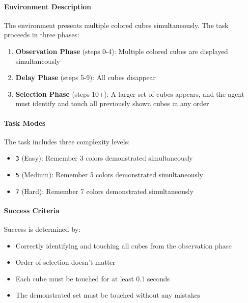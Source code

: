 \paragraph{Environment Description} The environment presents multiple colored cubes simultaneously. The task proceeds in three phases:
\begin{enumerate}
    \item \textbf{Observation Phase} (steps 0-4): Multiple colored cubes are displayed simultaneously
    \item \textbf{Delay Phase} (steps 5-9): All cubes disappear
    \item \textbf{Selection Phase} (steps 10+): A larger set of cubes appears, and the agent must identify and touch all previously shown cubes in any order 
\end{enumerate}

\paragraph{Task Modes} The task includes three complexity levels:
\begin{itemize}
    \item \texttt{3} (Easy): Remember 3 colors demonstrated simultaneously
    \item \texttt{5} (Medium): Remember 5 colors demonstrated simultaneously
    \item \texttt{7} (Hard): Remember 7 colors demonstrated simultaneously
\end{itemize}

\paragraph{Success Criteria} Success is determined by:
\begin{itemize}
    \item Correctly identifying and touching all cubes from the observation phase
    \item Order of selection doesn't matter
    \item Each cube must be touched for at least 0.1 seconds
    \item The demonstrated set must be touched without any mistakes
\end{itemize}

